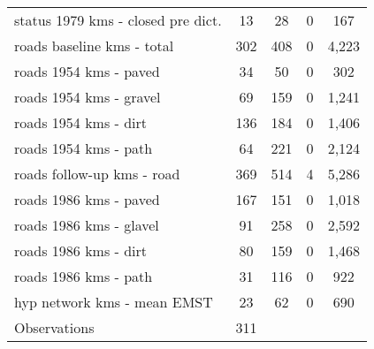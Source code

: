 \begin{table}[htbp]
\begin{tabular}{l*{1}{cccc}}
status 1979 kms - closed pre dict.&          13&          28&           0&         167\\
roads baseline kms - total&         302&         408&           0&       4,223\\
roads 1954 kms - paved&          34&          50&           0&         302\\
roads 1954 kms - gravel&          69&         159&           0&       1,241\\
roads 1954 kms - dirt&         136&         184&           0&       1,406\\
roads 1954 kms - path&          64&         221&           0&       2,124\\
roads follow-up kms - road&         369&         514&           4&       5,286\\
roads 1986 kms - paved&         167&         151&           0&       1,018\\
roads 1986 kms - glavel&          91&         258&           0&       2,592\\
roads 1986 kms - dirt&          80&         159&           0&       1,468\\
roads 1986 kms - path&          31&         116&           0&         922\\
hyp network kms - mean EMST &          23&          62&           0&         690\\
\hline
Observations        &         311&            &            &            \\
\hline\hline
\end{tabular}
\end{table}
